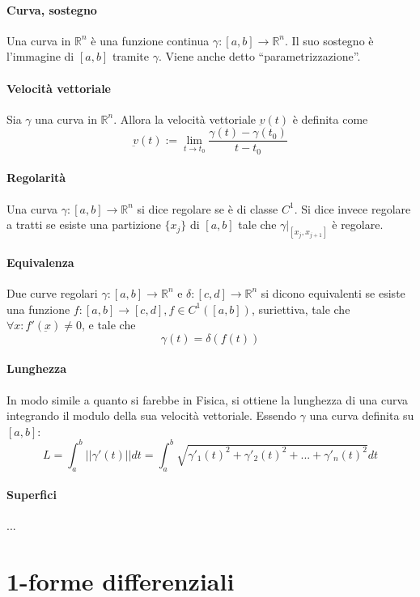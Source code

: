 \documentclass[a4paper,12pt]{article}
\begin{document}
\paragraph{Curva, sostegno}
Una curva in $\mathbb{R}^n$ è una funzione continua $\gamma:[a,b]\rightarrow\mathbb{R}^n$.
Il suo sostegno è l'immagine di $[a,b]$ tramite $\gamma$. Viene anche detto ``parametrizzazione''.
\paragraph{Velocità vettoriale}
Sia $\gamma$ una curva in $\mathbb{R}^n$. Allora la velocità vettoriale $\underbar{v}(t)$ è definita come
$$\underbar{v}(t) := \lim_{t\to t_0} \dfrac{\gamma(t)-\gamma(t_0)}{t-t_0}$$

\paragraph{Regolarità}
Una curva $\gamma:[a,b]\rightarrow\mathbb{R}^n$ si dice regolare se è di classe $C^1$. Si dice invece regolare a tratti se esiste una partizione $\{x_j\}$ di $[a,b]$ tale che $\gamma|_{[x_j, x_{j+1}]}$ è regolare.
\paragraph{Equivalenza}
Due curve regolari $\gamma :[a,b]\rightarrow\mathbb{R}^n$ e $\delta :[c,d]\rightarrow\mathbb{R}^n$ si dicono equivalenti se esiste una funzione 
$f:[a,b]\rightarrow[c,d], f \in C^1([a,b])$, suriettiva, tale che $\forall x: f'(\underbar{x}) \neq 0$, e tale che
$$\gamma(t) = \delta(f(t))$$
\paragraph{Lunghezza}
In modo simile a quanto si farebbe in Fisica, si ottiene la lunghezza di una curva integrando il modulo della sua velocità vettoriale. Essendo $\gamma$ una curva definita su $[a, b]$:
$$L= \int_a^b ||\gamma'(t)|| dt = \int_a^b\sqrt{\gamma'_1(t)^2+\gamma'_2(t)^2+...+\gamma'_n(t)^2}dt$$

\paragraph{Superfici}
...


\section{1-forme differenziali}
\end{document}
